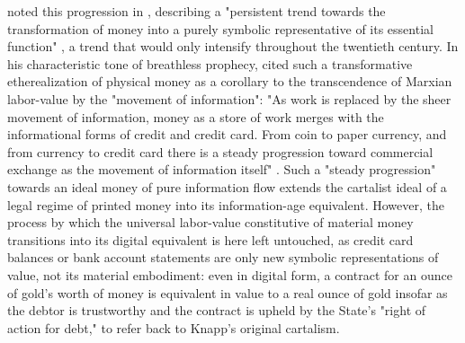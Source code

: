 \citeauthor{Simmel04} noted this progression in , describing a "persistent trend towards the transformation of money into a purely symbolic representative of its essential function" \autocite[191]{Simmel04}, a trend that would only intensify throughout the twentieth century. In his characteristic tone of breathless prophecy, \citeauthor{McLuhan64} cited such a transformative etherealization of physical money as a corollary to the transcendence of Marxian labor-value by the "movement of information": "As work is replaced by the sheer movement of information, money as a store of work merges with the informational forms of credit and credit card. From coin to paper currency, and from currency to credit card there is a steady progression toward commercial exchange as the movement of information itself" \autocite[137]{McLuhan64}. Such a "steady progression" towards an ideal money of pure information flow extends the cartalist ideal of a legal regime of printed money into its information-age equivalent. However, the process by which the universal labor-value constitutive of material money transitions into its digital equivalent is here left untouched, as credit card balances or bank account statements are only new symbolic representations of value, not its material embodiment: even in digital form, a contract for an ounce of gold's worth of money is equivalent in value to a real ounce of gold insofar as the debtor is trustworthy and the contract is upheld by the State's "right of action for debt," to refer back to Knapp's original cartalism.

